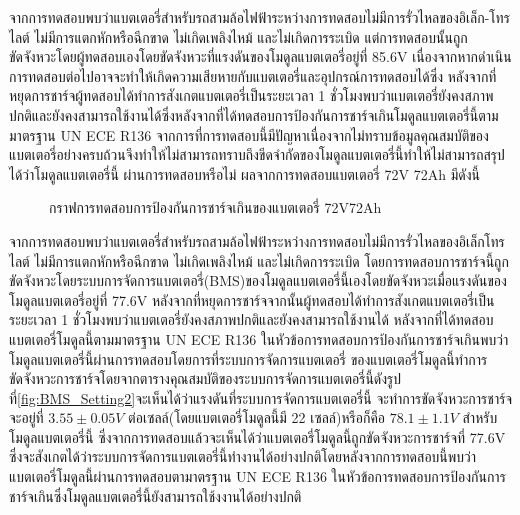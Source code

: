 จากการทดสอบพบว่าแบตเตอรี่สำหรับรถสามล้อไฟฟ้าระหว่างการทดสอบไม่มีการรั่วไหลของอิเล็ก-โทรไลต์ ไม่มีการแตกหักหรือฉีกขาด ไม่เกิดเพลิงไหม้ และไม่เกิดการระเบิด
แต่การทดสอบนั้นถูกขัดจังหวะโดยผู้ทดสอบเองโดยขัดจังหวะที่แรงดันของโมดูลแบตเตอรี่อยู่ที่ 85.6V เนื่องจากหากดำเนินการทดสอบต่อไปอาจจะทำให้เกิดความเสียหายกับแบตเตอรี่และอุปกรณ์การทดสอบได้ซึ่ง
หลังจากที่หยุดการชาร์จผู้ทดสอบได้ทำการสังเกตแบตเตอรี่เป็นระยะเวลา 1 ชั่วโมงพบว่าแบตเตอรี่ยังคงสภาพปกติและยังคงสามารถใช้งานได้ซึ่งหลังจากที่ได้ทดสอบการป้องกันการชาร์จเกินโมดูลแบตเตอรี่นี้ตามมาตรฐาน
UN ECE R136 จากการที่การทดสอบนี้มีปัญหาเนื่องจากไม่ทราบข้อมูลคุณสมบัติของแบตเตอรี่อย่างครบถ้วนจึงทำให้ไม่สามารถทราบถึงขีดจำกัดของโมดูลแบตเตอรี่นี้ทำให้ไม่สามารถสรุปได้ว่าโมดูลแบตเตอรี่นี้
ผ่านการทดสอบหรือไม่
\newpage
ผลจากการทดสอบแบตเตอรี่ 72V 72Ah มีดังนี้
\begin{center}
	\begin{figure}[H]
		\centering
		\captionsetup{justification=centering,margin=2cm}
		\caption{กราฟการทดสอบการป้องกันการชาร์จเกินของแบตเตอรี่ 72V72Ah}
	\end{figure}
\end{center}
จากการทดสอบพบว่าแบตเตอรี่สำหรับรถสามล้อไฟฟ้าระหว่างการทดสอบไม่มีการรั่วไหลของอิเล็กโทรไลต์ ไม่มีการแตกหักหรือฉีกขาด ไม่เกิดเพลิงไหม้ และไม่เกิดการระเบิด
โดยการทดสอบการชาร์จนี้ถูกขัดจังหวะโดยระบบการจัดการแบตเตอรี่(BMS)ของโมดูลแบตเตอรี่นี้เองโดยขัดจังหวะเมื่อแรงดันของโมดูลแบตเตอรี่อยู่ที่ 77.6V
หลังจากที่หยุดการชาร์จจากนั้นผู้ทดสอบได้ทำการสังเกตแบตเตอรี่เป็นระยะเวลา 1 ชั่วโมงพบว่าแบตเตอรี่ยังคงสภาพปกติและยังคงสามารถใช้งานได้
หลังจากที่ได้ทดสอบแบตเตอรี่โมดูลนี้ตามมาตรฐาน UN ECE R136 ในหัวข้อการทดสอบการป้องกันการชาร์จเกินพบว่าโมดูลแบตเตอรี่นี้ผ่านการทดสอบโดยการที่ระบบการจัดการแบตเตอรี่
ของแบตเตอรี่โมดูลนี้ทำการขัดจังหวะการชาร์จโดยจากตารางคุณสมบัติของระบบการจัดการแบตเตอรี่นี้ดังรูปที่\ref{fig:BMS_Setting2}จะเห็นได้ว่าแรงดันที่ระบบการจัดการแบตเตอรี่นี้
จะทำการขัดจังหวะการชาร์จจะอยู่ที่ $3.55\pm 0.05V$ ต่อเซลล์(โดยแบตเตอรี่โมดูลนี้มี 22 เซลล์)หรือก็คือ $78.1\pm 1.1V$ สำหรับโมดูลแบตเตอรี่นี้
ซึ่งจากการทดสอบแล้วจะเห็นได้ว่าแบตเตอรี่โมดูลนี้ถูกขัดจังหวะการชาร์จที่ 77.6V ซึ่งจะสังเกตได้ว่าระบบการจัดการแบตเตอรี่นี้ทำงานได้อย่างปกติโดยหลังจากการทดสอบนี้พบว่าแบตเตอรี่โมดูลนี้ผ่านการทดสอบตามาตรฐาน
UN ECE R136 ในหัวข้อการทดสอบการป้องกันการชาร์จเกินซึ่งโมดูลแบตเตอรี่นี้ยังสามารถใช้งงานได้อย่างปกติ
